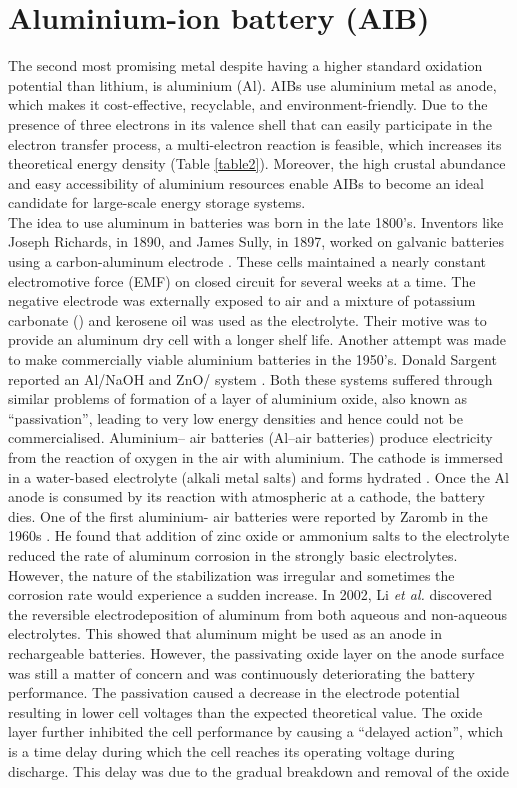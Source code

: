 \section{Aluminium-ion battery (AIB)}
The second most promising metal despite having a higher standard oxidation potential than lithium, is aluminium (Al). AIBs use aluminium metal as anode, which makes it cost-effective, recyclable, and environment-friendly. Due to the presence of three electrons in its valence shell that can easily participate in the electron transfer process, a multi-electron reaction is feasible, which increases its theoretical energy density (Table \ref{table2}). Moreover, the high crustal abundance and easy accessibility of aluminium resources enable AIBs to become an ideal candidate for large-scale energy storage systems. \\
The idea to use aluminum in batteries was born in the late 1800's. Inventors like Joseph Richards, in 1890, and James Sully, in 1897, worked on galvanic batteries using a carbon-aluminum electrode \cite{noauthor_james_1897,richards_aluminium_1890}. These cells maintained a nearly constant electromotive force (EMF) on closed circuit for several weeks at a time. The negative electrode was externally exposed to air and a mixture of potassium carbonate () and kerosene oil was used as the electrolyte. Their motive was to provide an aluminum dry cell with a longer shelf life. Another attempt was made to make commercially viable aluminium batteries in the 1950's. Donald Sargent reported an Al/NaOH and ZnO/ system . Both these systems suffered through similar problems of formation of a layer of aluminium oxide, also known as \enquote{passivation}, leading to very low energy densities and hence could not be commercialised. Aluminium– air batteries (Al–air batteries) produce electricity from the reaction of oxygen in the air with aluminium. The cathode is immersed in a water-based electrolyte (alkali metal salts) and forms hydrated . Once the Al anode is consumed by its reaction with atmospheric  at a cathode, the battery dies. One of the first aluminium- air batteries were reported by Zaromb in the 1960s \cite{zaromb_use_1962}. He found that addition of zinc oxide or ammonium salts to the electrolyte reduced the rate of aluminum corrosion in the strongly basic electrolytes. However, the nature of the stabilization was irregular and sometimes the corrosion rate would experience a sudden increase\cite{bockstie_control_1963}. In 2002, Li \textit{et al.} discovered the reversible electrodeposition of aluminum from both aqueous and non-aqueous electrolytes\cite{li_aluminum_2002}. This showed that aluminum might be used as an anode in rechargeable batteries. However, the passivating oxide layer on the anode surface was still a matter of concern and was continuously deteriorating the battery performance. The passivation caused a decrease in the electrode potential resulting in lower cell voltages than the expected theoretical value. The oxide layer further inhibited the cell performance by causing a \enquote{delayed action}, which is a time delay during which the cell reaches its operating voltage during discharge. This delay was due to the gradual breakdown and removal of the oxide 